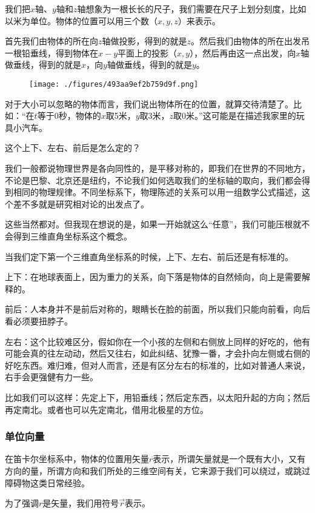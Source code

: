 我们把$x$轴、$y$轴和$z$轴想象为一根长长的尺子，我们需要在尺子上划分刻度，比如以米为单位。物体的位置可以用三个数（$x, y, z$）来表示。

首先我们由物体的所在向$z$轴做投影，得到的就是$z$。然后我们由物体的所在出发吊一根铅垂线，得到物体在$x-y$平面上的投影（$x, y$），然后再由这一点出发，向$x$轴做垂线，得到的就是$x$，向$y$轴做垂线，得到的就是$y$。
\begin{figure}[ht]
\centering
\texttt{[image: ./figures/493aa9ef2b759d9f.png]}
\caption\label{fig_QMPre6_4}
\end{figure}

对于大小可以忽略的物体而言，我们说出物体所在的位置，就算交待清楚了。比如：“在$t$等于0秒，物体的$x$取5米，$y$取3米，$z$取0米。”这可能是在描述我家里的玩具小汽车。

这个上下、左右、前后是怎么定的？

我们一般都说物理世界是各向同性的，是平移对称的，即我们在世界的不同地方，不论是巴黎、北京还是纽约，不论我们如何选取我们的坐标轴的取向，我们都会得到相同的物理规律。不同坐标系下，物理陈述的关系可以用一组数学公式描述，这个差不多就是研究相对论的出发点了。

这些当然都对。但我现在想说的是，如果一开始就这么“任意”，我们可能压根就不会得到三维直角坐标系这个概念。

当我们定下第一个三维直角坐标系的时候，上下、左右、前后还是有标准的。

上下：在地球表面上，因为重力的关系，向下落是物体的自然倾向，向上是需要解释的。

前后：人本身并不是前后对称的，眼睛长在脸的前面，所以我们只能向前看，向后看必须要扭脖子。

左右：这个比较难区分，假如你在一个小孩的左侧和右侧放上同样的好吃的，他有可能会真的往左动动，然后又往右，如此纠结、犹豫一番，才会扑向左侧或右侧的好吃东西。难归难，但对人而言，还是有区分左右的标准的，比如对普通人来说，右手会更强健有力一些。

比如我们可以这样：先定上下，用铅垂线；然后定东西，以太阳升起的方向；然后再定南北。或者也可以先定南北，借用北极星的方位。

\subsubsection{单位向量}

在笛卡尔坐标系中，物体的位置用矢量$r$表示，所谓矢量就是一个既有大小，又有方向的量，所谓方向和我们所处的三维空间有关，它来源于我们可以绕过，或跳过障碍物这类日常经验。

为了强调$r$是矢量，我们用符号$\vec r$表示。


